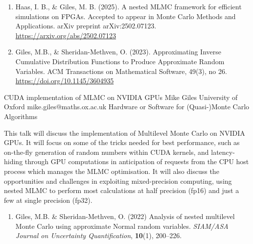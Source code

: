 \begin{talk}
\begin{enumerate}
    \item[{[2]}] Haas, I. B., \& Giles, M. B. (2025). A nested MLMC framework for efficient simulations on FPGAs. Accepted to appear in Monte Carlo Methods and Applications. arXiv preprint arXiv:2502.07123. \url{https://arxiv.org/abs/2502.07123}

     \item[{[3]}] Giles, M.B., \& Sheridan-Methven, O. (2023). Approximating Inverse Cumulative Distribution Functions to Produce Approximate Random Variables. ACM Transactions on Mathematical Software, 49(3), no 26. \url{https://doi.org/10.1145/3604935}
\end{enumerate}

\end{talk}

\begin{talk}
  {CUDA implementation of MLMC on NVIDIA GPUs}%
  {Mike Giles}%
  {University of Oxford}%
  {mike.giles@maths.ox.ac.uk}%
  {}%
  {Hardware or Software for (Quasi-)Monte Carlo Algorithms}%
    
   

This talk will discuss the implementation of Multilevel Monte Carlo
on NVIDIA GPUs.  It will focus on some of the tricks needed for best
performance, such as on-the-fly generation of random numbers within
CUDA kernels, and latency-hiding through GPU computations in anticipation
of requests from the CPU host process which manages the MLMC optimisation.
It will also discuss the opportunities and challenges in exploiting
mixed-precision computing, using nested MLMC to perform most calculations
at half precision (fp16) and just a few at single precision (fp32).

\medskip

\begin{enumerate}
\item[{[1]}] Giles, M.B. \& Sheridan-Methven, O. (2022)
  Analysis of nested multilevel Monte Carlo using approximate
  Normal random variables. {\it SIAM/ASA
Journal on Uncertainty Quantification}, \textbf{10}(1), 200--226.
\end{enumerate}

\end{talk}

